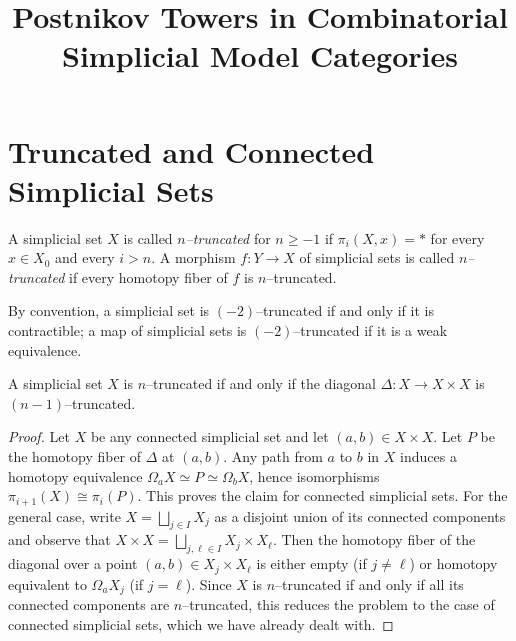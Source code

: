 




\title{Postnikov Towers in Combinatorial Simplicial Model Categories} \date{}
\maketitle

{\footnotesize
  \tableofcontents
}

\section{Truncated and Connected Simplicial Sets}

\begin{definition}\label{defn:truncated_simp}
  A simplicial set \(X\) is called \emph{\(n\)--truncated} for \(n\geq-1\) if
  \(\pi_{i}(X,x) = *\) for every \(x\in X_{0}\) and every \(i>n\). A morphism
  \(f\colon Y\to X\) of simplicial sets is called \emph{\(n\)--truncated} if
  every homotopy fiber of \(f\) is \(n\)--truncated.

  By convention, a simplicial set is \((-2)\)--truncated if and only if it is
  contractible; a map of simplicial sets is \((-2)\)--truncated if it is a weak
  equivalence.
\end{definition}

\begin{lemma}\label{lem:truncated-diagonal}
  A simplicial set \(X\) is \(n\)--truncated if and only if the diagonal
  \(\Delta\colon X\to X\times X\) is \((n-1)\)--truncated.
\end{lemma}
\begin{proof}
  Let \(X\) be any connected simplicial set and let \((a,b)\in X\times X\). Let
  \(P\) be the homotopy fiber of \(\Delta\) at \((a,b)\). Any path from \(a\) to
  \(b\) in \(X\) induces a homotopy equivalence \(\Omega_{a}X \simeq P \simeq
  \Omega_{b} X\), hence isomorphisms \(\pi_{i+1}(X)\cong \pi_{i}(P)\). This
  proves the claim for connected simplicial sets. For the general case, write
  \(X = \bigsqcup_{j\in I} X_{j}\) as a disjoint union of its connected
  components and observe that \(X\times X = \bigsqcup_{j,\ell\in I} X_{j}\times
  X_{\ell}\). Then the homotopy fiber of the diagonal over a point \((a,b)\in
  X_{j}\times X_{\ell}\) is either empty (if \(j\neq \ell\)) or homotopy
  equivalent to \(\Omega_{a}X_{j}\) (if \(j = \ell\)). Since \(X\) is
  \(n\)--truncated if and only if all its connected components are
  \(n\)--truncated, this reduces the problem to the case of connected simplicial
  sets, which we have already dealt with.
\end{proof}

